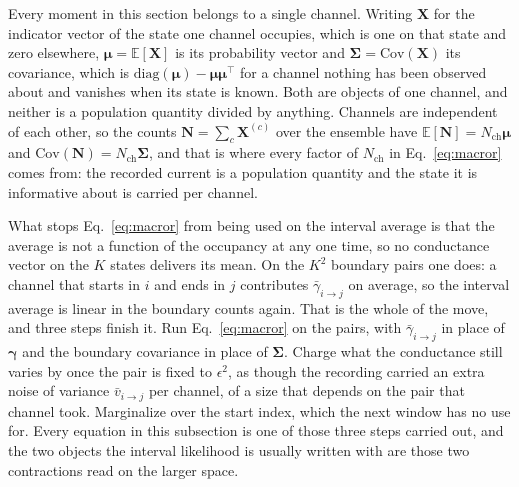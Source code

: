 Every moment in this section belongs to a single channel. Writing $\mathbf{X}$ for the
indicator vector of the state one channel occupies, which is one on that state and zero
elsewhere, $\bm{\mu}=\mathbb{E}[\mathbf{X}]$ is its probability vector and
$\bm{\Sigma}=\mathrm{Cov}(\mathbf{X})$ its covariance, which is
$\mathrm{diag}(\bm{\mu})-\bm{\mu}\bm{\mu}^\top$ for a channel nothing has been observed about
and vanishes when its state is known. Both are objects of one channel, and neither is a
population quantity divided by anything. Channels are independent of each other, so the counts
$\mathbf{N}=\sum_c \mathbf{X}^{(c)}$ over the ensemble have
$\mathbb{E}[\mathbf{N}]=N_{\mathrm{ch}}\bm{\mu}$ and
$\mathrm{Cov}(\mathbf{N})=N_{\mathrm{ch}}\bm{\Sigma}$, and that is where every factor of
$N_{\mathrm{ch}}$ in Eq.~\ref{eq:macror} comes from: the recorded current is a population
quantity and the state it is informative about is carried per channel.

What stops Eq.~\ref{eq:macror} from being used on the interval average is that the average is
not a function of the occupancy at any one time, so no conductance vector on the $K$ states
delivers its mean. On the $K^2$ boundary pairs one does: a channel that starts in $i$ and
ends in $j$ contributes $\bar{\gamma}_{i\to j}$ on average, so the interval average
is linear in the boundary counts again. That is the whole of the move, and three steps finish
it. Run Eq.~\ref{eq:macror} on the pairs, with $\bar{\gamma}_{i\to j}$ in place of
$\bm{\gamma}$ and the boundary covariance in place of $\bm{\Sigma}$. Charge what the
conductance still varies by once the pair is fixed to $\epsilon^2$, as though the recording
carried an extra noise of variance $\bar{v}_{i\to j}$ per channel, of a size that
depends on the pair that channel took. Marginalize over the start index, which the next window
has no use for. Every equation in this subsection is one of those three steps carried out, and
the two objects the interval likelihood is usually written with are those two contractions
read on the larger space.

